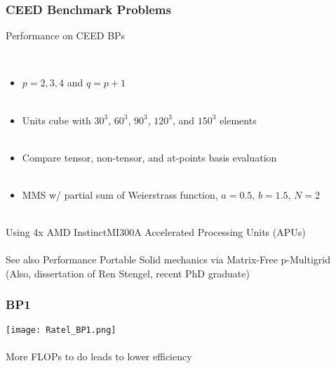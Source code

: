 \documentclass{beamer}
\begin{document}
\begin{frame}
\begin{center}
\frametitle{CEED Benchmark Problems}

Performance on CEED BPs

~\\

\begin{itemize}

\item $p = 2, 3, 4$ and $q = p + 1$\\

~\\

\item Units cube with $30^3$, $60^3$, $90^3$, $120^3$, and $150^3$ elements\\

~\\

\item Compare tensor, non-tensor, and at-points basis evaluation\\

~\\

\item MMS w/ partial sum of Weierstrass function, $a = 0.5$, $b = 1.5$, $N = 2$\\

\end{itemize}

~\\

Using 4x AMD Instinct\texttrademark MI300A Accelerated Processing Units (APUs)\\

~\\

See also Performance Portable Solid mechanics via Matrix-Free p-Multigrid\\

(Also, dissertation of Ren Stengel, recent PhD graduate)

\end{center}
\end{frame}


\begin{frame}
\begin{center}
\frametitle{BP1}

\texttt{[image: Ratel\_BP1.png]}\\

~\\

More FLOPs to do leads to lower efficiency

\end{center}
\end{frame}
\end{document}
